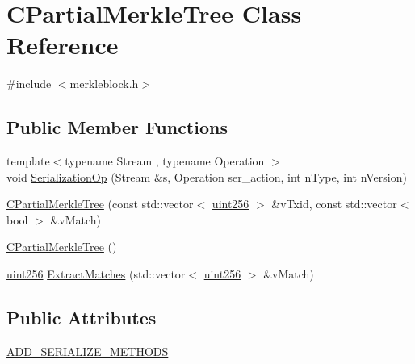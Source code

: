 \hypertarget{class_c_partial_merkle_tree}{}\section{C\+Partial\+Merkle\+Tree Class Reference}
\label{class_c_partial_merkle_tree}


{\ttfamily \#include $<$merkleblock.\+h$>$}

\subsection*{Public Member Functions}
\begin{DoxyCompactItemize}
\item 
{\footnotesize template$<$typename Stream , typename Operation $>$ }\\void \mbox{\hyperlink{class_c_partial_merkle_tree_a44903b156e6c77f3ef977324b24daf1f}{Serialization\+Op}} (Stream \&s, Operation ser\+\_\+action, int n\+Type, int n\+Version)
\item 
\mbox{\hyperlink{class_c_partial_merkle_tree_a0656767dc0d8f3d603c54e5be21d3890}{C\+Partial\+Merkle\+Tree}} (const std\+::vector$<$ \mbox{\hyperlink{classuint256}{uint256}} $>$ \&v\+Txid, const std\+::vector$<$ bool $>$ \&v\+Match)
\item 
\mbox{\hyperlink{class_c_partial_merkle_tree_aad4948ace869c92614310846f9d9980d}{C\+Partial\+Merkle\+Tree}} ()
\item 
\mbox{\hyperlink{classuint256}{uint256}} \mbox{\hyperlink{class_c_partial_merkle_tree_a28c3456d1159b33b6c2689ac88eb56ad}{Extract\+Matches}} (std\+::vector$<$ \mbox{\hyperlink{classuint256}{uint256}} $>$ \&v\+Match)
\end{DoxyCompactItemize}
\subsection*{Public Attributes}
\begin{DoxyCompactItemize}
\item 
\mbox{\hyperlink{class_c_partial_merkle_tree_ae218db8103edb6672fe0d642535c7490}{A\+D\+D\+\_\+\+S\+E\+R\+I\+A\+L\+I\+Z\+E\+\_\+\+M\+E\+T\+H\+O\+DS}}
\end{DoxyCompactItemize}
